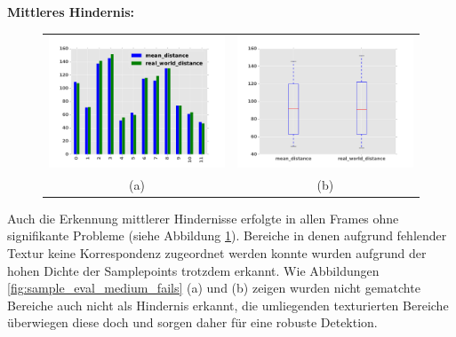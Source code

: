 	\noindent
	\textbf{Mittleres Hindernis:}\\

	\begin{figure}[h]
		\centering
		\begin{tabular}{cc}
		\includegraphics[width=7cm]{img/evaluation/sample_medium_bar}&
		\includegraphics[width=7cm]{img/evaluation/sample_medium_box}\\
		 (a) & (b)
		\end{tabular}
		\caption{}
	    \label{fig:sample_eval_medium}
	\end{figure}

	\noindent
	Auch die Erkennung mittlerer Hindernisse erfolgte in allen Frames ohne signifikante Probleme (siehe Abbildung \ref{fig:sample_eval_medium}). Bereiche in denen aufgrund fehlender Textur keine Korrespondenz zugeordnet werden konnte wurden aufgrund der hohen Dichte der Samplepoints trotzdem erkannt. Wie Abbildungen \ref{fig:sample_eval_medium_fails} (a) und (b) zeigen wurden nicht gematchte Bereiche auch nicht als Hindernis erkannt, die umliegenden texturierten Bereiche überwiegen diese doch und sorgen daher für eine robuste Detektion.

